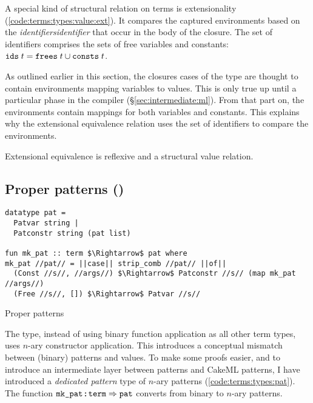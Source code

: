A special kind of structural relation on terms is extensionality (\cref{code:terms:types:value:ext}).
It compares the captured environments based on the \emph{identifiers}\emph{identifier} that occur in the body of the closure.
The set of identifiers comprises the sets of free variables and constants: $\texttt{\textup{ids}}\;t = \texttt{\textup{frees}}\;t \cup \texttt{\textup{consts}}\;t$.

As outlined earlier in this section, the closures cases of the  type are thought to contain environments mapping variables to values.
This is only true up until a particular phase in the compiler (§\ref{sec:intermediate:ml}).
From that part on, the environments contain mappings for both variables and constants.
This explains why the extensional equivalence relation uses the set of identifiers to compare the environments.

\begin{lemma}
  Extensional equivalence is reflexive and a structural value relation.
\end{lemma}

\subsection{Proper patterns ()}
\label{sec:terms:types:pat}

\begin{code}[t]
  \begin{lstlisting}[language=Isabelle]
datatype pat =
  Patvar string |
  Patconstr string (pat list)

fun mk_pat :: term $\Rightarrow$ pat where
mk_pat //pat// = ||case|| strip_comb //pat// ||of||
  (Const //s//, //args//) $\Rightarrow$ Patconstr //s// (map mk_pat //args//)
  (Free //s//, []) $\Rightarrow$ Patvar //s//\end{lstlisting}
  \caption{Proper patterns}
  \label{code:terms:types:pat}
\end{code}

The  type, instead of using binary function application as all other term types, uses $n$-ary constructor application.
This introduces a conceptual mismatch between (binary) patterns and values.
To make some proofs easier, and to introduce an intermediate layer between  patterns and CakeML patterns, I have introduced a \emph{dedicated pattern} type of $n$-ary patterns (\cref{code:terms:types:pat}).
The function $\texttt{\textup{mk\_pat}} \mathbin{:\!\!:} \texttt{\textup{term}} \Rightarrow \texttt{\textup{pat}}$ converts from binary to $n$-ary patterns.

